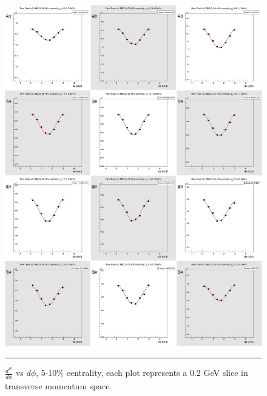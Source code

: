 \begin{figure}[htbp!]
  \centering
    \includegraphics[width=1\textwidth]{chargedtrackv2/htrkdphi2bbcs_1.jpg}
    \rule{35em}{0.5pt}
  \caption[$\frac{dN}{d\phi}$ vs $d\phi$, 5-10\% centrality.]{$\frac{d^N}{d\phi}$ vs $d\phi$, 5-10\% centrality, each plot represents a 0.2 GeV slice in transverse momentum space.}
  \label{fig:Ndphicent1}
\end{figure}
